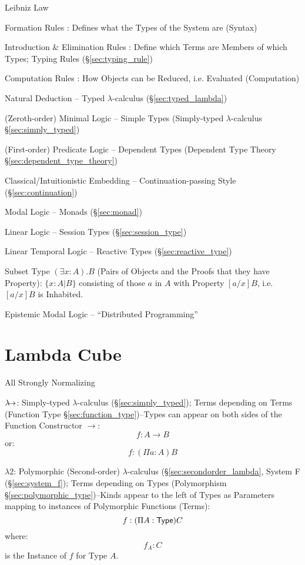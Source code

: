 Leibniz Law


\asterism


Formation Rules : Defines what the Types of the System are (Syntax)

Introduction \& Elimination Rules : Define which Terms are Members of
which Types; Typing Rules (\S\ref{sec:typing_rule})

Computation Rules : How Objects can be Reduced, i.e. Evaluated
(Computation)

Natural Deduction -- Typed $\lambda$-calculus
(\S\ref{sec:typed_lambda})

(Zeroth-order) Minimal Logic -- Simple Types (Simply-typed
$\lambda$-calculus \S\ref{sec:simply_typed})

(First-order) Predicate Logic -- Dependent Types (Dependent Type
Theory \S\ref{sec:dependent_type_theory})

Classical/Intuitionistic Embedding -- Continuation-passing Style
(\S\ref{sec:continuation})

Modal Logic -- Monads (\S\ref{sec:monad})

Linear Logic -- Session Types (\S\ref{sec:session_type})

Linear Temporal Logic -- Reactive Types (\S\ref{sec:reactive_type})

Subset Type $(\exists x:A).B$ (Pairs of Objects and the Proofs that
they have Property): $\{ x : A | B \}$ consisting of those $a$ in $A$
with Property $[a/x]B$, i.e. $[a/x]B$ is Inhabited.

Epistemic Modal Logic -- ``Distributed Programming''



\section{Lambda Cube}\label{sec:lambda_cube}

All Strongly Normalizing

$\lambda\kern-5pt\rightarrow$: Simply-typed $\lambda$-calculus
(\S\ref{sec:simply_typed}); Terms depending on Terms (Function Type
\S\ref{sec:function_type})--Types can appear on both sides of the
Function Constructor $\rightarrow$:
\[
  f:A \rightarrow B
\]
or:
\[
  f:(\Pi a:A)B
\]

$\lambda2$: Polymorphic (Second-order) $\lambda$-calculus
(\S\ref{sec:secondorder_lambda}, System F (\S\ref{sec:system_f});
Terms depending on Types (Polymorphism
\S\ref{sec:polymorphic_type})--Kinds appear to the left of Types as
Parameters mapping to instances of Polymorphic Functions (Terms):
\[
  f:(\Pi A:\mathsf{Type}) C
\]
where:
\[
  f_A : C
\]
is the Instance of $f$ for Type $A$.

